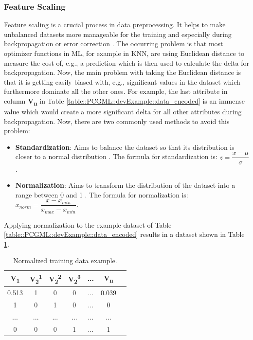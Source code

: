 \documentclass[MGS,Master,english]{twbook}%
\begin{document}
\subsubsection{Feature Scaling} %
Feature scaling is a crucial process in data preprocessing. It helps to make unbalanced datasets more manageable for the training and especially during backpropagation or error correction \cite{ml::book::developer}. The occurring problem is that most optimizer functions in ML, for example in \ac{KNN}, are using Euclidean distance to measure the cost of, e.g., a prediction which is then used to calculate the delta for backpropagation. Now, the main problem with taking the Euclidean distance is that it is getting easily biased with, e.g., significant values in the dataset which furthermore dominate all the other ones. For example, the last attribute in column \textbf{V\textsubscript{n}} in Table \ref{table::PCGML::devExample::data_encoded} is an immense value which would create a more significant delta for all other attributes during backpropagation. Now, there are two commonly used methods to avoid this problem:
\begin{itemize}
	\item \textbf{Standardization}: Aims to balance the dataset so that its distribution is closer to a normal distribution \cite{ml::book::developer}. The formula for standardization is: $z={\dfrac{x - \mu}{\sigma}}$.
	\item \textbf{Normalization}: Aims to transform the distribution of the dataset into a range between 0 and 1 \cite{ml::book::developer}. The formula for normalization is: $x_{norm}={\dfrac{x - x_{min}}{x_{max}-x_{min}}}$.
\end{itemize}
Applying normalization to the example dataset of Table \ref{table::PCGML::devExample::data_encoded} results in a dataset shown in Table \ref{table::PCGML::devExample::data_normalized}.
\begin{table}[!ht]
	\centering
	\begin{tabular}{|c|c|c|c|c|c|c|}
		\hline
		\textbf{V\textsubscript{1}} & \textbf{V\textsubscript{2}\textsuperscript{1}}& \textbf{V\textsubscript{2}\textsuperscript{2}}& \textbf{V\textsubscript{2}\textsuperscript{3}} & \textbf{...} & \textbf{V\textsubscript{n}} \\ \hline\hline
		0.513      & 1   & 0   & 0       & ...          & 0.039         \\ \hline
		1           & 0   & 1   & 0       & ...          & 0          \\ \hline
		...         & ... & ... & ...     & ...          & ...         \\ \hline
		0      & 0   & 0   & 1       & ...          & 1         \\ \hline
	\end{tabular}
	\caption{Normalized training data example.}
	\label{table::PCGML::devExample::data_normalized}
\end{table}
\end{document}
